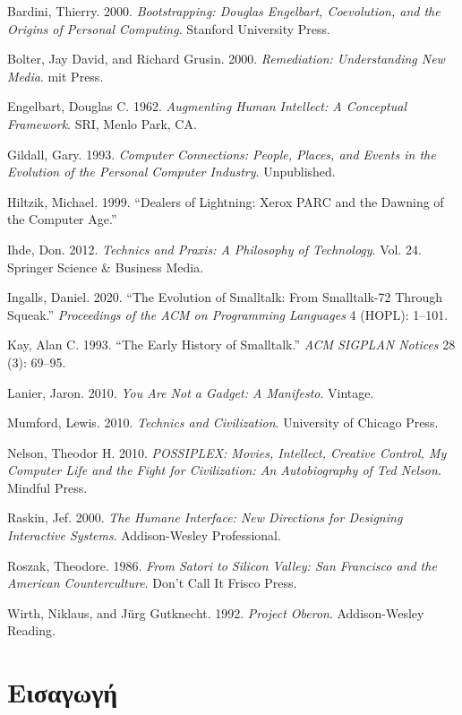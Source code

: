 \documentclass[
]{article}
\newlength{\cslhangindent}
\newlength{\cslentryspacingunit} %
\newenvironment{CSLReferences}[2] %
 {%
  \setlength{\parindent}{0pt}
  \ifodd #1
  \let\oldpar\par
  \def\par{\hangindent=\cslhangindent\oldpar}
  \fi
  \setlength{\parskip}{#2\cslentryspacingunit}
 }%
 {}
\begin{document}
\hypertarget{refs}{}
\begin{CSLReferences}{0}{0}
\end{CSLReferences}

Bardini, Thierry. 2000. \emph{Bootstrapping: Douglas Engelbart,
Coevolution, and the Origins of Personal Computing}. Stanford University
Press.

Bolter, Jay David, and Richard Grusin. 2000. \emph{Remediation:
Understanding New Media}. mit Press.

Engelbart, Douglas C. 1962. \emph{Augmenting Human Intellect: A
Conceptual Framework}. SRI, Menlo Park, CA.

Gildall, Gary. 1993. \emph{Computer Connections: People, Places, and
Events in the Evolution of the Personal Computer Industry}. Unpublished.

Hiltzik, Michael. 1999. {``Dealers of Lightning: Xerox PARC and the
Dawning of the Computer Age.''}

Ihde, Don. 2012. \emph{Technics and Praxis: A Philosophy of Technology}.
Vol. 24. Springer Science \& Business Media.

Ingalls, Daniel. 2020. {``The Evolution of Smalltalk: From Smalltalk-72
Through Squeak.''} \emph{Proceedings of the ACM on Programming
Languages} 4 (HOPL): 1--101.

Kay, Alan C. 1993. {``The Early History of Smalltalk.''} \emph{ACM
SIGPLAN Notices} 28 (3): 69--95.

Lanier, Jaron. 2010. \emph{You Are Not a Gadget: A Manifesto}. Vintage.

Mumford, Lewis. 2010. \emph{Technics and Civilization}. University of
Chicago Press.

Nelson, Theodor H. 2010. \emph{POSSIPLEX: Movies, Intellect, Creative
Control, My Computer Life and the Fight for Civilization: An
Autobiography of Ted Nelson}. Mindful Press.

Raskin, Jef. 2000. \emph{The Humane Interface: New Directions for
Designing Interactive Systems}. Addison-Wesley Professional.

Roszak, Theodore. 1986. \emph{From Satori to Silicon Valley: San
Francisco and the American Counterculture}. Don't Call It Frisco Press.

Wirth, Niklaus, and Jürg Gutknecht. 1992. \emph{Project Oberon}.
Addison-Wesley Reading.

\hypertarget{ux3b5ux3b9ux3c3ux3b1ux3b3ux3c9ux3b3ux3ae}{%
\section{Εισαγωγή}\label{ux3b5ux3b9ux3c3ux3b1ux3b3ux3c9ux3b3ux3ae}}
\end{document}
